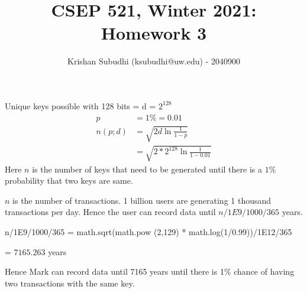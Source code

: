 \documentclass{homeworg}
\title{CSEP 521, Winter 2021: Homework 3}
\author{Krishan Subudhi (ksubudhi@uw.edu) - 2040900}
\begin{document}
\maketitle

\exercise
Unique keys possible with 128 bits = d =  $2^{128}$
\begin{align*}
p &= 1\% =0.01\\
n(p;d) &= \sqrt{2d \ln{\frac{1}{1-p}}}\\
& = \sqrt{2 \ast 2^{128} \ln{\frac{1}{1-0.01}}}
\end{align*}
Here $n$ is the number of keys that need to be generated until there is a $1\%$ probability that two keys are same. 

$n$ is the number of transactions. 1 billion users are generating 1 thousand transactions per day. Hence the user can record data until $n/1E9/1000/365$ years.

\begin{python}
n/1E9/1000/365 = math.sqrt(math.pow (2,129) * math.log(1/0.99))/1E12/365
\end{python}
 = $7165.263$ years
 
Hence Mark can record data until 7165 years until there is 1\% chance of having two transactions with the same key.
\newpage
\end{document}
